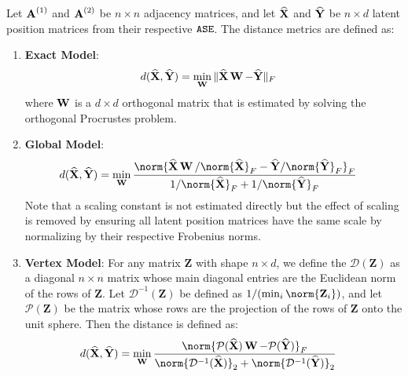 Let $\operatorname{\mathbf{A}}^{(1)}$ and $\operatorname{\mathbf{A}}^{(2)}$ be $n\times n$ adjacency matrices, and let $\widehat{\operatorname{\mathbf{X}}}$ and $\widehat{\operatorname{\mathbf{Y}}}$ be  $n \times d$ latent position matrices from their respective $\operatorname{\mathtt{ASE}}$. The distance metrics are defined as:
\begin{enumerate}[leftmargin=*]
    \item \textbf{Exact Model}:
    \begin{align}
    d(\widehat{\operatorname{\mathbf{X}}}, \widehat{\operatorname{\mathbf{Y}}}) &= \min_{\operatorname{\mathbf{W}} } \|\widehat{\operatorname{\mathbf{X}}}\operatorname{\mathbf{W}}-\widehat{\operatorname{\mathbf{Y}}}\|_F \label{eq:exact}
    \end{align}
    where $\operatorname{\mathbf{W}}$ is a $d \times d$ orthogonal matrix that is estimated by solving the orthogonal Procrustes problem. 
    \item \textbf{Global Model}:
    \begin{align}
    d(\hatX, \hatY) &= \min_{\W }
    \frac{\norm{\hatX \W/\norm{\hatX}_F - \hatY /\norm{\hatY}_F }_F}
    {1/\norm{\hatX}_F + 1/\norm{\hatY}_F}
    \end{align}
    Note that a scaling constant is not estimated directly but the effect of scaling is removed by ensuring all latent position matrices have the same scale by normalizing by their respective Frobenius norms.
    \item \textbf{Vertex Model}: 
    For any matrix $\mathbf Z$ with shape $n\times d$, we define the $\mathcal{D}(\mathbf{Z})$ as a diagonal $n\times n$ matrix whose main diagonal entries are the Euclidean norm of the rows of $\mathbf{Z}$. Let $\mathcal{D}^{-1}(\mathbf Z)$ be defined as $1/(\min_i \norm{\mathbf Z_i})$, and let $\mathcal{P}(\mathbf{Z})$ be the matrix whose rows are the projection of the rows of $\mathbf{Z}$ onto the unit sphere. Then the distance is defined as:
    \begin{align}
    d(\hatX, \hatY) &=\min_{\W} \frac{\norm{\mathcal{P}({\hatX}) \W - \mathcal{P}(\hatY)}_F}{\norm{\mathcal{D}^{-1}(\hatX)}_2 + \norm{\mathcal{D}^{-1}(\hatY)}_2}
    \end{align}
\end{enumerate}

